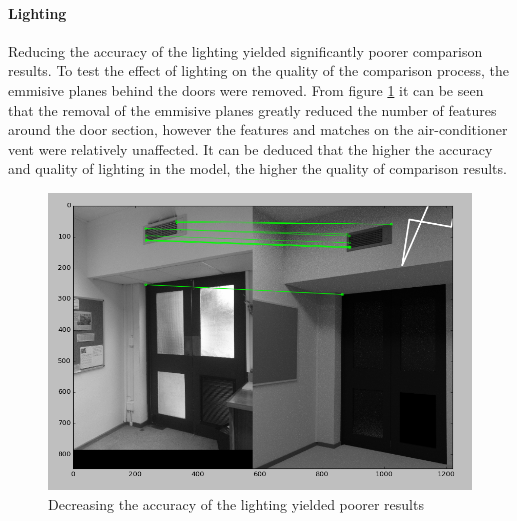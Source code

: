 \documentclass[11pt,a4paper]{report}
\begin{document}
				\paragraph{Lighting}
					Reducing the accuracy of the lighting yielded significantly poorer comparison results. To test the effect of lighting on the quality of the comparison process, the emmisive planes behind the doors were removed. From figure \ref{fig:reduced_lighting_results} it can be seen that the removal of the emmisive planes greatly reduced the number of features around the door section, however the features and matches on the air-conditioner vent were relatively unaffected. It can be deduced that the higher the accuracy and quality of lighting in the model, the higher the quality of comparison results.
					\begin{figure}[H]
						\centering
						\includegraphics[width=1\textwidth]{reduced_lighting_results}
						\caption[Lighting results]{Decreasing the accuracy of the lighting yielded poorer results}
						\label{fig:reduced_lighting_results}
					\end{figure}
					
\end{document}
